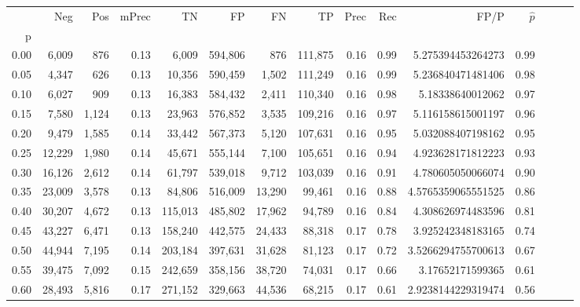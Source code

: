 \begin{tabular}{rrrrrrrrrrrrrrr}
\toprule
{} &      Neg &     Pos & mPrec &       TN &       FP &       FN &       TP &  Prec &   Rec &                  FP/P & $\hat{p}$ \\
p    &          &         &       &          &          &          &          &       &       &                       &           \\
\midrule
0.00 &    6,009 &     876 &  0.13 &    6,009 &  594,806 &      876 &  111,875 &  0.16 &  0.99 &     5.275394453264273 &      0.99 \\
0.05 &    4,347 &     626 &  0.13 &   10,356 &  590,459 &    1,502 &  111,249 &  0.16 &  0.99 &     5.236840471481406 &      0.98 \\
0.10 &    6,027 &     909 &  0.13 &   16,383 &  584,432 &    2,411 &  110,340 &  0.16 &  0.98 &      5.18338640012062 &      0.97 \\
0.15 &    7,580 &   1,124 &  0.13 &   23,963 &  576,852 &    3,535 &  109,216 &  0.16 &  0.97 &     5.116158615001197 &      0.96 \\
0.20 &    9,479 &   1,585 &  0.14 &   33,442 &  567,373 &    5,120 &  107,631 &  0.16 &  0.95 &     5.032088407198162 &      0.95 \\
0.25 &   12,229 &   1,980 &  0.14 &   45,671 &  555,144 &    7,100 &  105,651 &  0.16 &  0.94 &     4.923628171812223 &      0.93 \\
0.30 &   16,126 &   2,612 &  0.14 &   61,797 &  539,018 &    9,712 &  103,039 &  0.16 &  0.91 &     4.780605050066074 &      0.90 \\
0.35 &   23,009 &   3,578 &  0.13 &   84,806 &  516,009 &   13,290 &   99,461 &  0.16 &  0.88 &    4.5765359065551525 &      0.86 \\
0.40 &   30,207 &   4,672 &  0.13 &  115,013 &  485,802 &   17,962 &   94,789 &  0.16 &  0.84 &     4.308626974483596 &      0.81 \\
0.45 &   43,227 &   6,471 &  0.13 &  158,240 &  442,575 &   24,433 &   88,318 &  0.17 &  0.78 &     3.925242348183165 &      0.74 \\
0.50 &   44,944 &   7,195 &  0.14 &  203,184 &  397,631 &   31,628 &   81,123 &  0.17 &  0.72 &    3.5266294755700613 &      0.67 \\
0.55 &   39,475 &   7,092 &  0.15 &  242,659 &  358,156 &   38,720 &   74,031 &  0.17 &  0.66 &      3.17652171599365 &      0.61 \\
0.60 &   28,493 &   5,816 &  0.17 &  271,152 &  329,663 &   44,536 &   68,215 &  0.17 &  0.61 &    2.9238144229319474 &      0.56 \\

\end{tabular}
